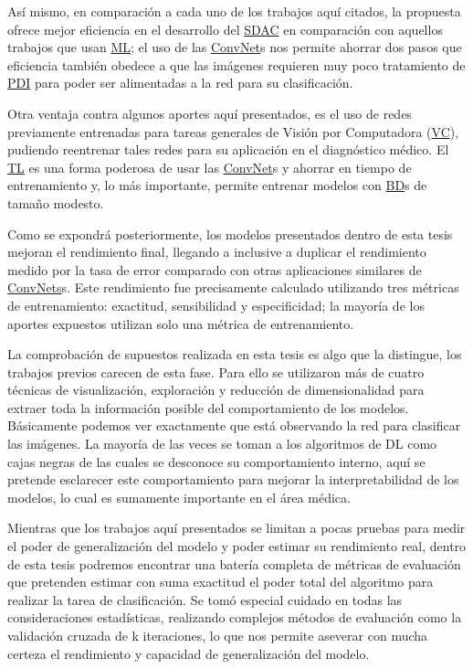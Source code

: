 Así mismo, en comparación a cada uno de los trabajos aquí citados, la propuesta
ofrece mejor eficiencia en el desarrollo del \hyperlink{abbr}{SDAC} en
comparación con aquellos trabajos que usan \hyperlink{abbr}{ML}; el uso de las
\hyperlink{abbr}{ConvNet}s nos permite ahorrar dos pasos que eficiencia también
obedece a que las imágenes requieren muy poco tratamiento de
\hyperlink{abbr}{PDI} para poder ser alimentadas a la red para su clasificación.

Otra ventaja contra algunos aportes aquí presentados, es el uso de redes
previamente entrenadas para tareas generales de Visión por Computadora
(\hyperlink{abbr}{VC}), pudiendo
reentrenar tales redes para su aplicación en el diagnóstico médico. El
\hyperlink{abbr}{TL} es una forma poderosa de usar las
\hyperlink{abbr}{ConvNet}s y ahorrar en tiempo de entrenamiento y, lo más
importante, permite entrenar modelos con \hyperlink{abbr}{BD}s de tamaño modesto.

Como se expondrá posteriormente, los modelos presentados dentro de esta tesis
mejoran el rendimiento final, llegando a inclusive a duplicar el rendimiento
medido por la tasa de error comparado con otras aplicaciones similares de
\hyperlink{abbr}{ConvNets}s. Este rendimiento fue precisamente calculado
utilizando tres métricas de entrenamiento: exactitud, sensibilidad y
especificidad; la mayoría de los aportes expuestos utilizan solo una métrica de
entrenamiento.

La comprobación de supuestos realizada en esta tesis es algo que la distingue,
los trabajos previos carecen de esta fase. Para ello se utilizaron más de cuatro
técnicas de visualización, exploración y reducción de dimensionalidad para
extraer toda la información posible del comportamiento de los modelos.
Básicamente podemos ver exactamente que está observando la red para clasificar
las imágenes. La mayoría de las veces se toman a los algoritmos de DL como cajas
negras de las cuales se desconoce su comportamiento interno, aquí se pretende
esclarecer este comportamiento para mejorar la interpretabilidad de los modelos,
lo cual es sumamente importante en el área médica.

Mientras que los trabajos aquí presentados se limitan a pocas pruebas para medir
el poder de generalización del modelo y poder estimar su rendimiento real,
dentro de esta tesis podremos encontrar una batería completa de métricas de
evaluación que pretenden estimar con suma exactitud el poder total del algoritmo
para realizar la tarea de clasificación. Se tomó especial cuidado en todas las
consideraciones estadísticas, realizando complejos métodos de evaluación como la
validación cruzada de k iteraciones, lo que nos permite aseverar con mucha
certeza el rendimiento y capacidad de generalización del modelo.

